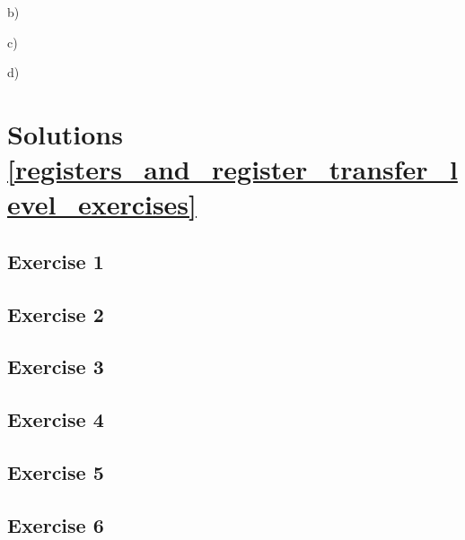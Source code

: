 b) %

c) %

d) %

\section{Solutions \ref{registers_and_register_transfer_level_exercises}~}
\subsection*{Exercise 1}

\subsection*{Exercise 2}

\subsection*{Exercise 3}

\subsection*{Exercise 4}

\subsection*{Exercise 5}

\subsection*{Exercise 6}

